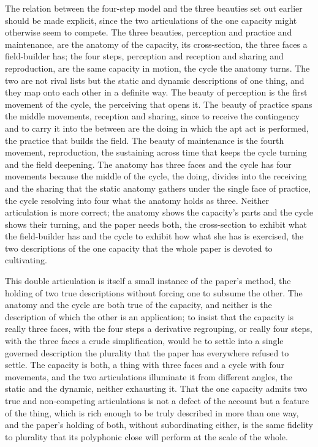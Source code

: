 The relation between the four-step model and the three beauties set out earlier should be made explicit, since the two articulations of the one capacity might otherwise seem to compete. The three beauties, perception and practice and maintenance, are the anatomy of the capacity, its cross-section, the three faces a field-builder has; the four steps, perception and reception and sharing and reproduction, are the same capacity in motion, the cycle the anatomy turns. The two are not rival lists but the static and dynamic descriptions of one thing, and they map onto each other in a definite way. The beauty of perception is the first movement of the cycle, the perceiving that opens it. The beauty of practice spans the middle movements, reception and sharing, since to receive the contingency and to carry it into the between are the doing in which the apt act is performed, the practice that builds the field. The beauty of maintenance is the fourth movement, reproduction, the sustaining across time that keeps the cycle turning and the field deepening. The anatomy has three faces and the cycle has four movements because the middle of the cycle, the doing, divides into the receiving and the sharing that the static anatomy gathers under the single face of practice, the cycle resolving into four what the anatomy holds as three. Neither articulation is more correct; the anatomy shows the capacity's parts and the cycle shows their turning, and the paper needs both, the cross-section to exhibit what the field-builder has and the cycle to exhibit how what she has is exercised, the two descriptions of the one capacity that the whole paper is devoted to cultivating.

This double articulation is itself a small instance of the paper's method, the holding of two true descriptions without forcing one to subsume the other. The anatomy and the cycle are both true of the capacity, and neither is the description of which the other is an application; to insist that the capacity is really three faces, with the four steps a derivative regrouping, or really four steps, with the three faces a crude simplification, would be to settle into a single governed description the plurality that the paper has everywhere refused to settle. The capacity is both, a thing with three faces and a cycle with four movements, and the two articulations illuminate it from different angles, the static and the dynamic, neither exhausting it. That the one capacity admits two true and non-competing articulations is not a defect of the account but a feature of the thing, which is rich enough to be truly described in more than one way, and the paper's holding of both, without subordinating either, is the same fidelity to plurality that its polyphonic close will perform at the scale of the whole.

